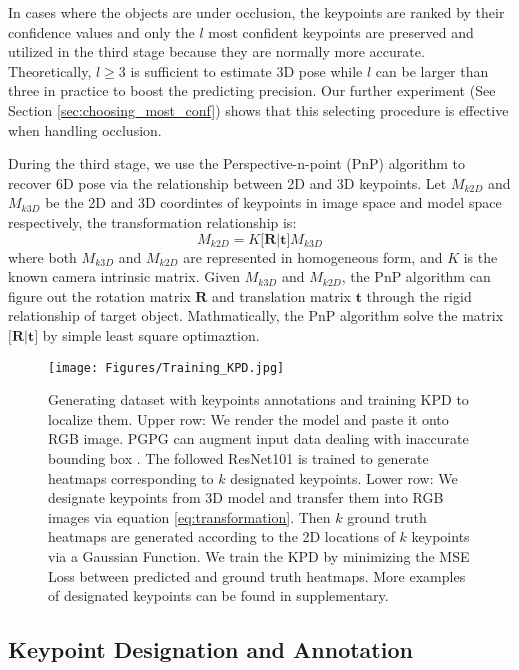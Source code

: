 \documentclass[10pt,twocolumn,letterpaper]{article}
\begin{document}
In cases where the objects are under occlusion, the keypoints are ranked by their confidence values and only the $l$ most confident keypoints are preserved and utilized in the third stage because they are normally more accurate. Theoretically, $l\geqslant 3$ is sufficient to estimate 3D pose while $l$ can be larger than three in practice to boost the predicting precision. Our further experiment (See Section \ref{sec:choosing_most_conf}) shows that this selecting procedure is effective when handling occlusion.

During the third stage, we use the Perspective-n-point (PnP) \cite{Lepetit2008EPnPAA} algorithm to recover 6D pose via the relationship between 2D and 3D keypoints. Let $M_{k2D}$ and $M_{k3D}$ be the 2D and 3D coordintes of keypoints in image space and model space respectively, the transformation relationship is:
\begin{equation}
\label{eq:transformation}
    M_{k2D} = K\big[\mathbf{R}\big|\mathbf{t}\big]M_{k3D}
\end{equation}
where both $M_{k3D}$ and $M_{k2D}$ are represented in homogeneous form, and $K$ is the known camera intrinsic matrix. Given $M_{k3D}$ and $M_{k2D}$, the PnP algorithm can figure out the rotation matrix $\mathbf{R}$ and translation matrix $\mathbf{t}$ through the rigid relationship of target object. Mathmatically, the PnP algorithm solve the matrix $[\mathbf{R}\big|\mathbf{t}\big]$ by simple least square optimaztion.

\begin{figure*}[t]
\begin{center}
   \texttt{[image: Figures/Training\_KPD.jpg]}
\end{center}
   \caption{Generating dataset with keypoints annotations and training KPD to localize them. Upper row: We render the model and paste it onto RGB image. PGPG can augment input data dealing with inaccurate bounding box \cite{fang2017rmpe}. The followed ResNet101 is trained to generate heatmaps corresponding to $k$ designated keypoints. Lower row: We designate keypoints from 3D model and transfer them into RGB images via equation \ref{eq:transformation}. Then $k$ ground truth heatmaps are generated according to the 2D locations of $k$ keypoints via a Gaussian Function. We train the KPD by minimizing the MSE Loss between predicted and ground truth heatmaps. More examples of designated keypoints can be found in supplementary.}
\label{fig:training_kpd}
\end{figure*}
\subsection{Keypoint Designation and Annotation}
\label{sec:Synthetic_dataset}
\end{document}
